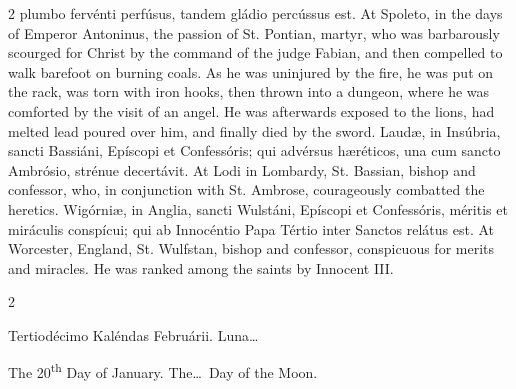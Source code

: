 \begin{paracol}{2}
 plumbo fervénti perfúsus, tandem gládio percússus est.
\switchcolumn
{}
At Spoleto, in the days of Emperor Antoninus, the passion of St. Pontian, 
 martyr, who was barbarously scourged for Christ by the command of the judge 
 Fabian, and then compelled to walk barefoot on burning coals. As he 
 was uninjured by the fire, he was put on the rack, was torn with iron hooks, 
 then thrown into a dungeon, where he was comforted by the visit of an angel. 
 He was afterwards exposed to the lions, had melted lead poured over him, and 
 finally died by the sword.
\switchcolumn*
{}
Laudæ, in Insúbria, sancti Bassiáni, Epíscopi 
 et Confessóris; qui advérsus hæréticos, una cum sancto Ambrósio, strénue 
 decertávit.
\switchcolumn
{}
At Lodi in Lombardy, St. Bassian, bishop and confessor, who, in conjunction 
 with St. Ambrose, courageously combatted the heretics.
\switchcolumn*
{}
Wigórniæ, in Anglia, sancti Wulstáni, Epíscopi 
 et Confessóris, méritis et miráculis conspícui; qui ab Innocéntio Papa 
 Tértio inter Sanctos relátus est.
\switchcolumn
{}
At Worcester, England, St. Wulfstan, bishop and confessor, conspicuous for 
 merits and miracles. He was ranked among the saints by Innocent III.
\switchcolumn*
{}
\end{paracol}


\begin{paracol}{2}
\begin{center}{\color{gregoriocolor} Tertiodécimo Kaléndas Februárii. 
 Luna\dots\ }\end{center}
\switchcolumn
{}
\begin{center}{\color{gregoriocolor} The 20\textsuperscript{th} Day of 
 January. The\dots\ Day of the Moon.}\end{center}
\end{paracol}

